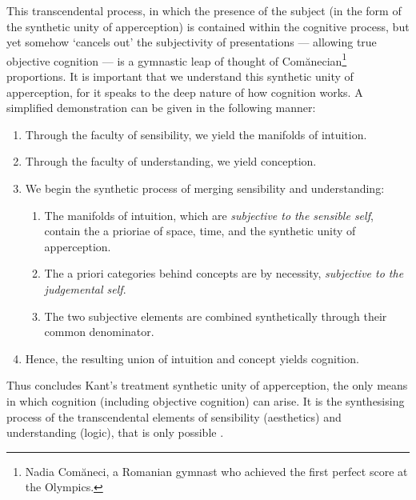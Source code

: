 This transcendental process, in which the presence of the subject (in the form of the synthetic unity of apperception) is contained within the cognitive process, but yet somehow \enquote*{cancels out} the subjectivity of presentations --- allowing true objective cognition --- is a gymnastic leap of thought of Comănecian\footnote{Nadia Comăneci, a Romanian gymnast who achieved the first perfect score at the Olympics.} proportions. It is important that we understand this synthetic unity of apperception, for it speaks to the deep nature of how cognition works. A simplified demonstration can be given in the following manner:


\begin{enumerate}
  \item Through the faculty of sensibility, we yield the manifolds of intuition.
  \item Through the faculty of understanding, we yield conception.
  \item We begin the synthetic process of merging sensibility and understanding:
  \begin{enumerate}
    \item The manifolds of intuition, which are \emph{subjective to the sensible self}, contain the a prioriae of space, time, and the synthetic unity of apperception.
    \item The a priori categories behind concepts are by necessity, \emph{subjective to the judgemental self}.
    \item The two subjective elements are combined synthetically through their common denominator.
  \end{enumerate}
  \item Hence, the resulting union of intuition and concept yields cognition.
\end{enumerate}

\noindent
Thus concludes Kant's treatment synthetic unity of apperception, the only means in which cognition (including objective cognition) can arise. It is the synthesising process of the transcendental elements of sensibility (aesthetics) and understanding (logic), that is only possible .

